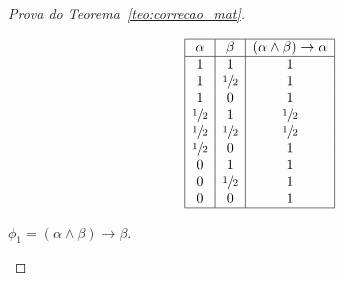 \begin{proof}[Prova do Teorema~\ref{teo:correcao_mat}]
\begin{provaporcasos}
\begin{provaporsubcasos}
                    \begin{center}
                        \[
                            \begin{array}{|c|c|c|}%
                                \hline%
                                \alpha      & \beta & (\alpha \land \beta) \to \alpha \\
                                \hline%
                                1 & 1 &                 1\\
                                1 & \meio{} &1\\
                                1 & 0 &1\\
                                \meio{} & 1 &\meio{}\\
                                \meio{} & \meio{} &\meio{}\\
                                \meio{} & 0 &1\\
                                0 & 1 &1\\
                                0 & \meio{} &1\\
                                0 & 0 &1\\
                                \hline%
                            \end{array}
                        \]
                    \end{center}
                    

                    \subcasodeprova{} $\phi_{1} = (\alpha \land \beta) \to \beta$.


\end{provaporsubcasos}
\end{provaporcasos}
\end{proof}
